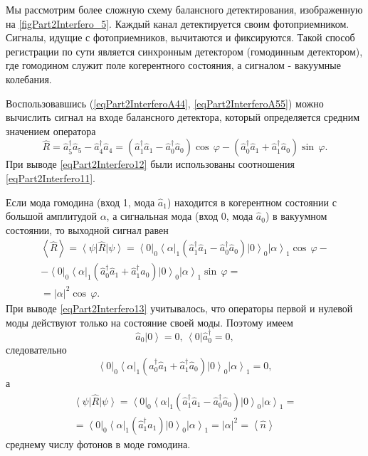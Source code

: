 

Мы рассмотрим более сложную схему балансного детектирования,
изображенную на \autoref{figPart2Interfero_5}. Каждый канал
детектируется своим фотоприемником. Сигналы, идущие с фотоприемников, 
вычитаются и фиксируются. Такой способ регистрации по сути является
синхронным детектором (гомодинным детектором), где гомодином служит
поле когерентного состояния, а сигналом - вакуумные колебания.

Воспользовавшись (\ref{eqPart2InterferoA44},
\ref{eqPart2InterferoA55}) можно вычислить
сигнал на входе балансного детектора, который определяется средним значением
оператора  
\begin{equation}
\hat{R} = 
\hat{a}_5^{\dag} \hat{a}_5 - 
\hat{a}_4^{\dag} \hat{a}_4 =
\left(
\hat{a}_1^{\dag} \hat{a}_1 - 
\hat{a}_0^{\dag} \hat{a}_0
\right) \cos\,\varphi -
\left(
\hat{a}_0^{\dag} \hat{a}_1 + 
\hat{a}_1^{\dag} \hat{a}_0
\right) \sin\,\varphi.
\label{eqPart2Interfero12}
\end{equation}
При выводе \eqref{eqPart2Interfero12} были использованы соотношения
\eqref{eqPart2Interfero11}.

Если мода гомодина (вход 1, мода $\hat{a}_1$) находится в
когерентном состоянии с большой амплитудой $\alpha$, а сигнальная мода
(вход 0, мода $\hat{a}_0$) в вакуумном состоянии, то выходной сигнал
равен
\begin{eqnarray}
\left<\hat{R}\right> = 
\left<\psi\right|\hat{R} \left|\psi\right> = 
\left<0\right|_0\left<\alpha\right|_1
\left(
\hat{a}_1^{\dag} \hat{a}_1 - 
\hat{a}_0^{\dag} \hat{a}_0
\right)
\left|0\right>_0\left|\alpha\right>_1
\cos\,\varphi
-
\nonumber \\
-
\left<0\right|_0\left<\alpha\right|_1
\left(
\hat{a}_0^{\dag} \hat{a}_1 + 
\hat{a}_1^{\dag} \hat{a}_0
\right) 
\left|0\right>_0\left|\alpha\right>_1
\sin\,\varphi = 
\nonumber \\
= \left|\alpha\right|^2 \cos\,\varphi.
\label{eqPart2Interfero13}
\end{eqnarray}
При выводе \eqref{eqPart2Interfero13} учитывалось, что операторы
первой и нулевой моды действуют только на состояние своей
моды. Поэтому имеем
\[
\hat{a}_0\left|0\right> = 0, \, 
\left<0\right|\hat{a}_0^{\dag} = 0,
\]
следовательно 
\[
\left<0\right|_0\left<\alpha\right|_1
\left(
\hat{a}_0^{\dag} \hat{a}_1 + 
\hat{a}_1^{\dag} \hat{a}_0
\right) 
\left|0\right>_0\left|\alpha\right>_1 = 0,
\]
а
\begin{eqnarray}
\left<\psi\right|\hat{R} \left|\psi\right>= 
\left<0\right|_0\left<\alpha\right|_1
\left(
\hat{a}_1^{\dag} \hat{a}_1 - 
\hat{a}_0^{\dag} \hat{a}_0
\right)
\left|0\right>_0\left|\alpha\right>_1
=
\nonumber \\
=
\left<0\right|_0\left<\alpha\right|_1
\left(
\hat{a}_1^{\dag} \hat{a}_1
\right)
\left|0\right>_0\left|\alpha\right>_1
= \left|\alpha\right|^2 = 
\left<\hat{n}\right>
\nonumber
\end{eqnarray}
среднему числу фотонов в моде гомодина.

